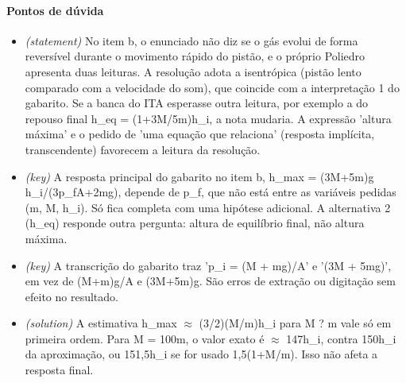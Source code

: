 \documentclass{article}%
\begin{document}
\paragraph{Pontos de dúvida}%
\begin{itemize}%
\item%
\textit{(statement)} No item b, o enunciado não diz se o gás evolui de forma reversível durante o movimento rápido do pistão, e o próprio Poliedro apresenta duas leituras. A resolução adota a isentrópica (pistão lento comparado com a velocidade do som), que coincide com a interpretação 1 do gabarito. Se a banca do ITA esperasse outra leitura, por exemplo a do repouso final h\_eq = (1+3M/5m)h\_i, a nota mudaria. A expressão 'altura máxima' e o pedido de 'uma equação que relaciona' (resposta implícita, transcendente) favorecem a leitura da resolução.%
\item%
\textit{(key)} A resposta principal do gabarito no item b, h\_max = (3M+5m)g h\_i/(3p\_fA+2mg), depende de p\_f, que não está entre as variáveis pedidas (m, M, h\_i). Só fica completa com uma hipótese adicional. A alternativa 2 (h\_eq) responde outra pergunta: altura de equilíbrio final, não altura máxima.%
\item%
\textit{(key)} A transcrição do gabarito traz 'p\_i = (M + mg)/A' e '(3M + 5mg)', em vez de (M+m)g/A e (3M+5m)g. São erros de extração ou digitação sem efeito no resultado.%
\item%
\textit{(solution)} A estimativa h\_max $\approx$ (3/2)(M/m)h\_i para M ? m vale só em primeira ordem. Para M = 100m, o valor exato é $\approx$ 147h\_i, contra 150h\_i da aproximação, ou 151,5h\_i se for usado 1,5(1+M/m). Isso não afeta a resposta final.%
\end{itemize}%
\end{document}
